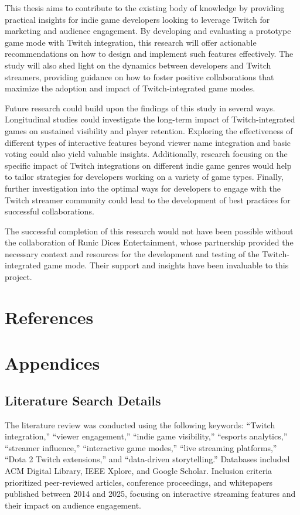 \documentclass[conference]{IEEEtran}
\begin{document}
This thesis aims to contribute to the existing body of knowledge by providing practical insights for indie game developers looking to leverage Twitch for marketing and audience engagement. By developing and evaluating a prototype game mode with Twitch integration, this research will offer actionable recommendations on how to design and implement such features effectively. The study will also shed light on the dynamics between developers and Twitch streamers, providing guidance on how to foster positive collaborations that maximize the adoption and impact of Twitch-integrated game modes.

Future research could build upon the findings of this study in several ways. Longitudinal studies could investigate the long-term impact of Twitch-integrated games on sustained visibility and player retention. Exploring the effectiveness of different types of interactive features beyond viewer name integration and basic voting could also yield valuable insights. Additionally, research focusing on the specific impact of Twitch integrations on different indie game genres would help to tailor strategies for developers working on a variety of game types. Finally, further investigation into the optimal ways for developers to engage with the Twitch streamer community could lead to the development of best practices for successful collaborations.

The successful completion of this research would not have been possible without the collaboration of Runic Dices Entertainment, whose partnership provided the necessary context and resources for the development and testing of the Twitch-integrated game mode. Their support and insights have been invaluable to this project.

\section{References}



\section{Appendices}
\subsection{Literature Search Details}
The literature review was conducted using the following keywords: ``Twitch integration,'' ``viewer engagement,'' ``indie game visibility,'' ``esports analytics,'' ``streamer influence,'' ``interactive game modes,'' ``live streaming platforms,'' ``Dota 2 Twitch extensions,'' and ``data-driven storytelling.'' Databases included ACM Digital Library, IEEE Xplore, and Google Scholar. Inclusion criteria prioritized peer-reviewed articles, conference proceedings, and whitepapers published between 2014 and 2025, focusing on interactive streaming features and their impact on audience engagement.
\end{document}
